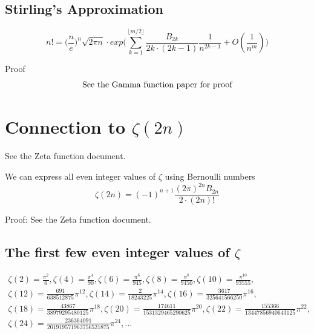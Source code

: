 \documentclass[a4paper]{article}
\begin{document}
\subsection{Stirling's Approximation}
\begin{theorem}

\begin{equation} 
n! = \Big( \frac{n}{e} \Big)^{n} \sqrt{2 \pi n} \cdot exp\Bigg(\sum_{k=1}^{\lfloor m/2 \rfloor} \frac{B_{2k}}{2k \cdot (2k-1)}  \frac{1}{n^{2k-1}} + O(\frac{1}{n^{m}})\Bigg) 
\end{equation}


Proof
\begin{gather*}
\intertext{See the Gamma function paper for proof}
\end{gather*}
\end{theorem}

\pagebreak

\section{Connection to $\zeta(2n)$}

See the Zeta function document. 

\begin{theorem}
We can express all even integer values of $\zeta$ using Bernoulli numbers
\begin{equation} \label{even zeta} 
\zeta(2n) = (-1)^{n+1} \frac{(2\pi)^{2n} B_{2n}}{2 \cdot (2n)!}
\end{equation}

Proof:
See the Zeta function document. 
\end{theorem}

\subsection{The first few even integer values of $\zeta$}

\begin{gather*}
\zeta(2) = \frac{\pi^2}{6}, 
\zeta(4) = \frac{\pi^4}{90},
\zeta(6) = \frac{\pi^6}{945},
\zeta(8) = \frac{\pi^8}{9450},
\zeta(10) = \frac{\pi^{10}}{93555},
\\
\zeta(12) = \frac{691}{638512875} \pi^{12},
\zeta(14) = \frac{2}{18243225} \pi^{14},
\zeta(16) = \frac{3617}{325641566250} \pi^{16},
\\
\zeta(18) = \frac{43867}{38979295480125} \pi^{18},
\zeta(20) = \frac{174611}{1531329465290625} \pi^{20},
\zeta(22) = \frac{155366}{13447856940643125} \pi^{22},
\\
\zeta(24) = \frac{236364091}{201919571963756521875} \pi^{24},
...
\end{gather*}

\pagebreak
\end{document}
